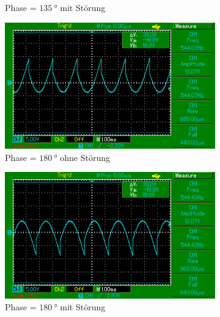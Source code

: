\begin{figure}[H]
\begin{subfigure}{0.495\linewidth}
        \caption{Phase = $\SI{135}{\degree}$ mit Störung}
        \label{fig:3f}
    \end{subfigure}
    \begin{subfigure}{0.495\linewidth} %
        \centering
        \includegraphics[width=\textwidth]{images/aufg2_phi180.jpg}
        \caption{Phase = $\SI{180}{\degree}$ ohne Störung}
        \label{fig:3g}
    \end{subfigure}
    \begin{subfigure}{0.495\linewidth}
        \centering
        \includegraphics[width=\textwidth]{images/aufg3_phi180.jpg}
        \caption{Phase = $\SI{180}{\degree}$ mit Störung}
        \label{fig:3h}
    \end{subfigure}
    \begin{subfigure}{0.495\linewidth} %
        \centering

\end{subfigure}
\end{figure}

